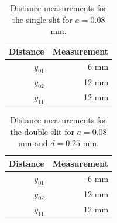 \begin{table}[ht]
	\centering
	\begin{tabular}{|r|r|} \hline
		Distance & Measurement \\
		\hline
		$y_{01}$ & 6 mm \\
		$y_{02}$ & 12 mm \\
		$y_{11}$ & 12 mm \\
		\hline
	\end{tabular}
	\caption{Distance measurements for the single slit for $a = 0.08$ mm.}
	\label{part1.single}
\end{table}
\begin{table}[ht]
	\centering
	\begin{tabular}{|r|r|} \hline
		Distance & Measurement \\
		\hline
		$y_{01}$ & 6 mm \\
		$y_{02}$ & 12 mm \\
		$y_{11}$ & 12 mm \\
		\hline
	\end{tabular}
	\caption{Distance measurements for the double slit for $a = 0.08$ mm and $d = 0.25$ mm.}
	\label{part1.double}
\end{table}
\newpage
